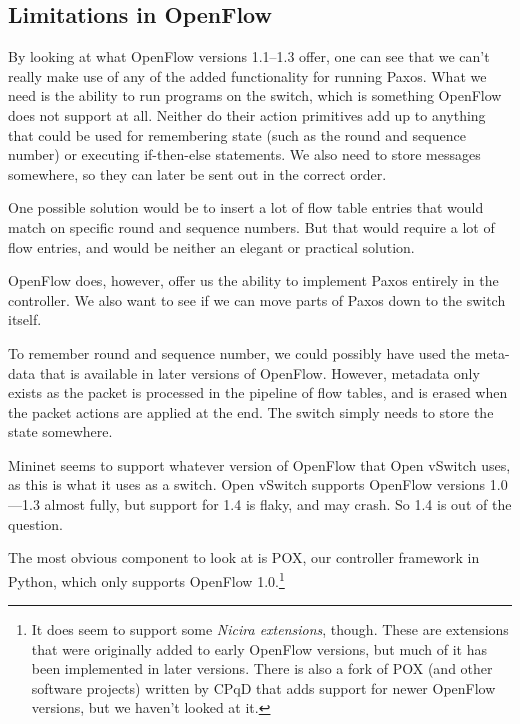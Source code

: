 \subsection{Limitations in OpenFlow}

By looking at what OpenFlow versions 1.1--1.3 offer,
one can see that we can't really make use of any of the added functionality
for running Paxos.  What we need is the ability to run programs on the
switch, which is something OpenFlow does not support at all.  Neither do
their action primitives add up to anything that could be used for
remembering state (such as the round and sequence number)  or executing
if-then-else statements.
%
We also need to store messages somewhere, so they can later be sent out in
the correct order.

One possible solution would be to insert a lot of flow table entries that
would match on specific round and sequence numbers.
%
But that would require a lot of flow entries, and would be neither an
elegant or practical solution.

OpenFlow does, however, offer us the ability to implement Paxos entirely
in the controller.
%
We also want to see if we can move parts of Paxos down to the switch itself.

To remember round and sequence number, we could possibly have used the
meta-data that is available in later versions of
OpenFlow.
%
However, metadata only exists as the packet is processed in the pipeline of
flow tables, and is erased when the packet actions are applied at the end.
%
The switch simply needs to store the state somewhere.

Mininet seems to support whatever version of OpenFlow that Open vSwitch uses,
as this is what it uses as a switch.  Open vSwitch
supports OpenFlow versions 1.0---1.3
almost fully, but support for 1.4 is flaky, and may crash.  So 1.4 is out of the question.

The most obvious component to look at is POX, our controller framework in
Python, which only supports OpenFlow 1.0.\footnote{It does seem to support
some \textit{Nicira extensions}, though.  These are extensions that were originally added to
early OpenFlow versions, but much of it has been implemented in later
versions.  There is also a fork of POX (and other software projects) written
by CPqD that adds support for newer OpenFlow versions, but we haven't looked
at it.}


